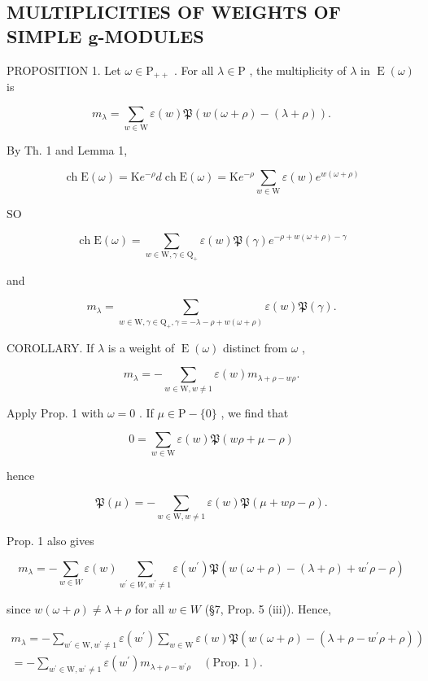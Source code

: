 \subsection{MULTIPLICITIES OF WEIGHTS OF SIMPLE g-MODULES}

PROPOSITION 1. Let \(\omega \in \mathrm{P}_{++}\) . For all \(\lambda \in \mathrm{P}\) , the multiplicity of \(\lambda\) in \(\operatorname{E}(\omega)\) is

\[
m _ {\lambda} = \sum_ {w \in \mathrm{W}} \varepsilon (w) \mathfrak {P} (w (\omega + \rho) - (\lambda + \rho)).
\]

By Th. 1 and Lemma 1,

\[
\operatorname{ch} \mathrm{E} (\omega) = \mathrm{K} e ^ {- \rho} d \operatorname{ch} \mathrm{E} (\omega) = \mathrm{K} e ^ {- \rho} \sum_ {w \in \mathrm{W}} \varepsilon (w) e ^ {w (\omega + \rho)}
\]

SO

\[
\operatorname{ch} \mathrm{E} (\omega) = \sum_ {w \in \mathrm{W}, \gamma \in \mathrm{Q} _ {+}} \varepsilon (w) \mathfrak {P} (\gamma) e ^ {- \rho + w (\omega + \rho) - \gamma}
\]

and

\[
m _ {\lambda} = \sum_ {w \in \mathrm{W}, \gamma \in \mathrm{Q} _ {+}, \gamma = - \lambda - \rho + w (\omega + \rho)} \varepsilon (w) \mathfrak {P} (\gamma).
\]

COROLLARY. If \(\lambda\) is a weight of \(\operatorname{E}(\omega)\) distinct from \(\omega\) ,

\[
m _ {\lambda} = - \sum_ {w \in \mathrm{W}, w \neq 1} \varepsilon (w) m _ {\lambda + \rho - w \rho}.
\]

Apply Prop. 1 with \(\omega = 0\) . If \(\mu \in \mathrm{P} - \{0\}\) , we find that

\[
0 = \sum_ {w \in \mathrm{W}} \varepsilon (w) \mathfrak {P} (w \rho + \mu - \rho)
\]

hence

\[
\mathfrak {P} (\mu) = - \sum_ {w \in \mathrm{W}, w \neq 1} \varepsilon (w) \mathfrak {P} (\mu + w \rho - \rho).\tag{1}
\]

Prop. 1 also gives

\[
m _ {\lambda} = - \sum_ {w \in W} \varepsilon (w) \sum_ {w ^ {\prime} \in W, w ^ {\prime} \neq 1} \varepsilon (w ^ {\prime}) \mathfrak {P} (w (\omega + \rho) - (\lambda + \rho) + w ^ {\prime} \rho - \rho)
\]

since \(w(\omega + \rho) \neq \lambda + \rho\) for all \(w \in W\) (§7, Prop. 5 (iii)). Hence,

\[
\begin{array}{l} m _ {\lambda} = - \sum_ {w ^ {\prime} \in \mathrm{W}, w ^ {\prime} \neq 1} \varepsilon (w ^ {\prime}) \sum_ {w \in \mathrm{W}} \varepsilon (w) \mathfrak {P} (w (\omega + \rho) - (\lambda + \rho - w ^ {\prime} \rho + \rho)) \\ = - \sum_ {w ^ {\prime} \in \mathrm{W}, w ^ {\prime} \neq 1} \varepsilon (w ^ {\prime}) m _ {\lambda + \rho - w ^ {\prime} \rho} \quad (\text {Prop. 1}). \end{array}
\]

